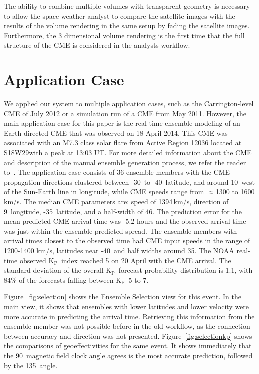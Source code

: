 \documentclass[journal]{vgtc}                %
\newcommand{\kpIndex}{$\textrm{K}_\textrm{P}$}
\begin{document}
The ability to combine multiple volumes with transparent geometry is necessary to allow the space weather analyst to compare the satellite images with the results of the volume rendering in the same setup by fading the satellite images. Furthermore, the 3 dimensional volume rendering is the first time that the full structure of the CME is considered in the analysts workflow.

\section{Application Case} \label{sec:applicationcase}
We applied our system to multiple application cases, such as the Carrington-level CME of July 2012 or a simulation run of a CME from May 2011. However, the main application case for this paper is the real-time ensemble modeling of an Earth-directed CME that was observed on 18 April 2014. This CME was associated with an M7.3 class solar flare from Active Region 12036 located at S18\degree W29\degree with a peak at 13:03 UT. For more detailed information about the CME and description of the manual ensemble generation process, we refer the reader to~\cite{mays2015ensemble}. The application case consists of 36 ensemble members with the CME propagation directions clustered between -30\degree\ to -40\degree\ latitude, and around 10\degree\ west of the Sun-Earth line in longitude, while CME speeds range from $\approx$1300 to 1600 km/s. The median CME parameters are: speed of 1394\,km/s, direction of 9\degree\ longitude, -35\degree\ latitude, and a half-width of 46\degree . The prediction error for the mean predicted CME arrival time was -5.2 hours and the observed arrival time was just within the ensemble predicted spread. The ensemble members with arrival times closest to the observed time had CME input speeds in the range of 1200-1400 km/s, latitudes near -40\degree\ and half widths around 35\degree . The NOAA real-time observed \kpIndex\ index reached 5 on 20 April with the CME arrival. The standard deviation of the overall \kpIndex\ forecast probability distribution is 1.1, with 84\% of the forecasts falling between \kpIndex\ 5 to 7.

Figure~\ref{fig:selection} shows the Ensemble Selection view for this event. In the main view, it shows that ensembles with lower latitudes and lower velocity were more accurate in predicting the arrival time. Retrieving this information from the ensemble member was not possible before in the old workflow, as the connection between accuracy and direction was not presented. Figure~\ref{fig:selectionkp} shows the comparisons of geoeffectivities for the same event. It shows immediately that the 90\degree\ magnetic field clock angle agrees is the most accurate prediction, followed by the 135\degree\ angle.
\end{document}
